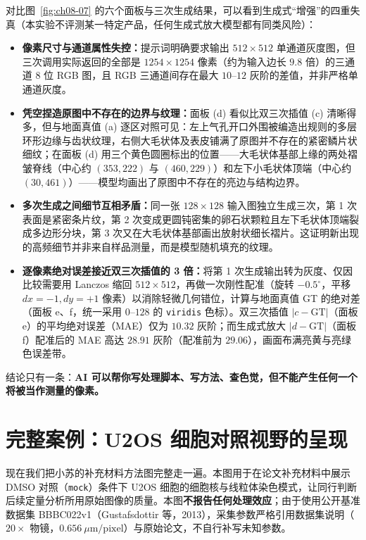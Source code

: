 对比图~\ref{fig:ch08-07} 的六个面板与三次生成结果，可以看到生成式“增强”的四重失真（本实验不评测某一特定产品，任何生成式放大模型都有同类风险）：
\begin{itemize}
\item \textbf{像素尺寸与通道属性失控：}提示词明确要求输出 $512 \times 512$ 单通道灰度图，但三次调用实际返回的全部是 $1254 \times 1254$ 像素（约为输入边长 $9.8$ 倍）的三通道 8 位 RGB 图，且 RGB 三通道间存在最大 $10\text{--}12$ 灰阶的差值，并非严格单通道灰度。
\item \textbf{凭空捏造原图中不存在的边界与纹理：}面板 (d) 看似比双三次插值 (c) 清晰得多，但与地面真值 (a) 逐区对照可见：左上气孔开口外围被编造出规则的多层环形边缘与齿状纹理，右侧大毛状体及表皮铺满了原图并不存在的紧密鳞片状细纹；在面板 (d) 用三个黄色圆圈标出的位置——大毛状体基部上缘的两处褶皱脊线（中心约 $(353, 222)$ 与 $(460, 229)$）和左下小毛状体顶端（中心约 $(30, 461)$）——模型均画出了原图中不存在的亮边与结构边界。
\item \textbf{多次生成之间细节互相矛盾：}同一张 $128 \times 128$ 输入图独立生成三次，第 1 次表面是紧密条片纹，第 2 次变成更圆钝密集的卵石状颗粒且左下毛状体顶端裂成多边形分块，第 3 次又在大毛状体基部画出放射状细长褶片。这证明新出现的高频细节并非来自样品测量，而是模型随机填充的纹理。
\item \textbf{逐像素绝对误差接近双三次插值的 3 倍：}将第 1 次生成输出转为灰度、仅因比较需要用 Lanczos 缩回 $512 \times 512$，再做一次刚性配准（旋转 $-0.5^\circ$，平移 $dx=-1, dy=+1$ 像素）以消除轻微几何错位，计算与地面真值 GT 的绝对差（面板 e、f，统一采用 $0\text{--}128$ 的 \texttt{viridis} 色标）。双三次插值 $|c - \text{GT}|$（面板 e）的平均绝对误差（MAE）仅为 $10.32$ 灰阶；而生成式放大 $|d - \text{GT}|$（面板 f）配准后的 MAE 高达 $28.91$ 灰阶（配准前为 $29.06$），画面布满亮黄与亮绿色误差带。
\end{itemize}

结论只有一条：\textbf{AI 可以帮你写处理脚本、写方法、查色觉，但不能产生任何一个将被当作测量的像素。}

\section{完整案例：U2OS 细胞对照视野的呈现}

现在我们把小苏的补充材料方法图完整走一遍。本图用于在论文补充材料中展示 DMSO 对照（\texttt{mock}）条件下 U2OS 细胞的细胞核与线粒体染色模式，让同行判断后续定量分析所用原始图像的质量。本图\textbf{不报告任何处理效应}；由于使用公开基准数据集 BBBC022v1（Gustafsdottir 等，2013），采集参数严格引用数据集说明（$20\times$ 物镜，$0.656\ \mu\text{m/pixel}$）与原始论文，不自行补写未知参数。

